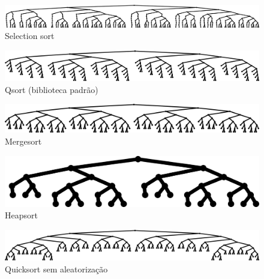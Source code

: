 \documentclass[12pt,a4paper]{article}
\begin{document}
	\begin{figure}[h!]
		\vspace*{0.3in}
		\centering
		\includegraphics[width=\textwidth]{selection_sort.png}
		\caption{Selection sort}
	\end{figure}

	\begin{figure}[h!]
		\vspace*{0.3in}
		\centering
		\includegraphics[width=\textwidth]{qsort.png}
		\caption{Qsort (biblioteca padrão)}
	\end{figure}

	\begin{figure}[h!]
		\vspace*{0.3in}
		\centering
		\includegraphics[width=\textwidth]{mergesort.png}
		\caption{Mergesort}
	\end{figure}

	\begin{figure}[h!]
		\vspace*{0.3in}
		\centering
		\includegraphics[width=\textwidth]{heapsort.png}
		\caption{Heapsort}
	\end{figure}

	\begin{figure}[h!]
		\vspace*{0.3in}
		\centering
		\includegraphics[width=\textwidth]{quicksort.png}
		\caption{Quicksort sem aleatorização}
	\end{figure}
\end{document}
